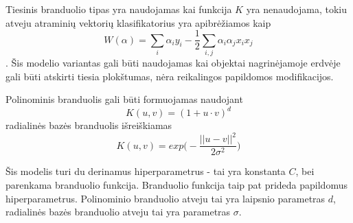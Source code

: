 Tiesinis branduolio tipas yra naudojamas kai funkcija $K$ yra nenaudojama, tokiu atveju atraminių vektorių klasifikatorius yra apibrėžiamos kaip
\begin{equation}
    W(\alpha) = \sum_{i}\alpha_i y_i - \frac{1}{2} \sum_{i, j} \alpha_i \alpha_j x_i x_j
\end{equation}.
Šis modelio variantas gali būti naudojamas kai objektai nagrinėjamoje erdvėje gali būti atskirti tiesia plokštumas, nėra reikalingos papildomos modifikacijos.

Polinominis branduolis gali būti formuojamas naudojant \cite{vw}
\begin{equation}
    K(u, v) = (1 + u \cdot v)^d
\end{equation}
radialinės bazės branduolis išreiškiamas
\begin{equation}
    K(u, v) = exp \big( - \frac{|| u - v ||^2}{2 \sigma ^ 2} \big)
\end{equation}

Šis modelis turi du derinamus hiperparametrus - tai yra konstanta $C$, bei parenkama branduolio funkcija. Branduolio funkcija taip pat prideda papildomus hiperparametrus. Polinominio branduolio atveju tai yra laipsnio parametras $d$, radialinės bazės branduolio atveju tai yra parametras $\sigma$.